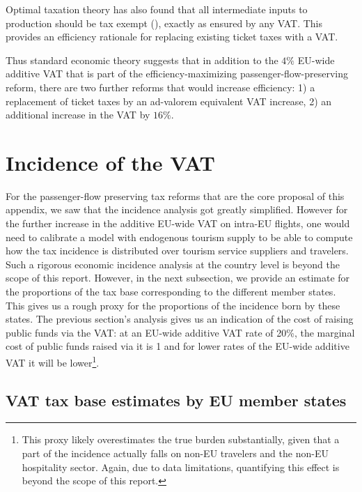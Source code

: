 \documentclass{article}
\begin{document}
Optimal taxation theory has also found that all intermediate inputs to production should be tax exempt (\citet{diamond1971optimalI}), exactly as ensured by any VAT. This provides an efficiency rationale for replacing existing ticket taxes with a VAT. 

Thus standard economic theory suggests that in addition to the $4\%$ EU-wide additive VAT that is part of the efficiency-maximizing passenger-flow-preserving reform, there are two further reforms that would increase efficiency: 1) a replacement of ticket taxes by an ad-valorem equivalent VAT increase, 2) an additional increase in the VAT by $16\%$. 

\section{Incidence of the VAT}

For the passenger-flow preserving tax reforms that are the core proposal of this appendix, we saw that the incidence analysis got greatly simplified. However for the further increase in the additive EU-wide VAT on intra-EU flights, one would need to calibrate a model with endogenous tourism supply to be able to compute how the tax incidence is distributed over tourism service suppliers and travelers. Such a rigorous economic incidence analysis at the country level is beyond the scope of this report. %
However, in the next subsection, we provide an estimate for the proportions of the tax base corresponding to the different member states. This gives us a rough proxy for the proportions of the incidence born by these states. The previous section's analysis gives us an indication of the cost of raising public funds via the VAT: at an EU-wide additive VAT rate of 20\%, the marginal cost of public funds raised via it is 1 and for lower rates of the EU-wide additive VAT it will be lower\footnote{This proxy likely overestimates the true burden substantially, given that a part of the incidence actually falls on non-EU travelers and the non-EU hospitality sector. Again, due to data limitations, quantifying this effect is beyond the scope of this report.}. 


\subsection{VAT tax base estimates by EU member states}
\end{document}
